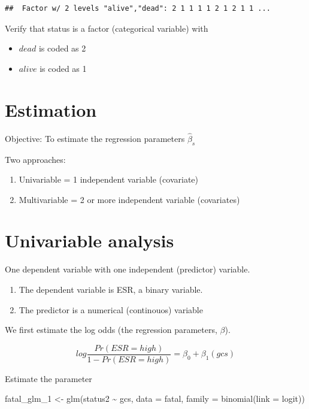 \documentclass[
]{book}
\makeatletter
\newenvironment{Shaded}{\begin{snugshade}}{\end{snugshade}}
\newcommand{\AttributeTok}[1]{\textcolor[rgb]{0.61,0.61,0.61}{#1}}
\newcommand{\FunctionTok}[1]{\textcolor[rgb]{0,0,0}{#1}}
\newcommand{\NormalTok}[1]{#1}
\newcommand{\OtherTok}[1]{\textcolor[rgb]{0.37,0.37,0.37}{#1}}
\newcommand{\SpecialCharTok}[1]{\textcolor[rgb]{0,0,0}{#1}}
\newcommand{\StringTok}[1]{\textcolor[rgb]{0.5,0.5,0.5}{#1}}
\providecommand{\tightlist}{%
  \setlength{\itemsep}{0pt}\setlength{\parskip}{0pt}}
\newenvironment{kframe}{%
\medskip{}
\setlength{\fboxsep}{.8em}
 \def\at@end@of@kframe{}%
 \ifinner\ifhmode%
  \def\at@end@of@kframe{\end{minipage}}%
  \begin{minipage}{\columnwidth}%
 \fi\fi%
 \def\FrameCommand##1{\hskip\@totalleftmargin \hskip-\fboxsep
 \colorbox{shadecolor}{##1}\hskip-\fboxsep
     \hskip-\linewidth \hskip-\@totalleftmargin \hskip\columnwidth}%
 \MakeFramed {\advance\hsize-\width
   \@totalleftmargin\z@ \linewidth\hsize
   \@setminipage}}%
 {\par\unskip\endMakeFramed%
 \at@end@of@kframe}
\renewenvironment{Shaded}{\begin{kframe}}{\end{kframe}}
\makeatother
\begin{document}
\begin{verbatim}
##  Factor w/ 2 levels "alive","dead": 2 1 1 1 1 2 1 2 1 1 ...
\end{verbatim}

Verify that status is a factor (categorical variable) with

\begin{itemize}
\tightlist
\item
  \(dead\) is coded as 2
\item
  \(alive\) is coded as 1
\end{itemize}

\hypertarget{estimation}{%
\section{Estimation}\label{estimation}}

Objective: To estimate the regression parameters \(\hat\beta_s\)

Two approaches:

\begin{enumerate}
\def\labelenumi{\arabic{enumi}.}
\tightlist
\item
  Univariable = 1 independent variable (covariate)
\item
  Multivariable = 2 or more independent variable (covariates)
\end{enumerate}

\hypertarget{univariable-analysis}{%
\section{Univariable analysis}\label{univariable-analysis}}

One dependent variable with one independent (predictor) variable.

\begin{enumerate}
\def\labelenumi{\arabic{enumi}.}
\tightlist
\item
  The dependent variable is ESR, a binary variable.
\item
  The predictor is a numerical (continouos) variable
\end{enumerate}

We first estimate the log odds (the regression parameters, \(\beta\)).

\[log\frac{Pr(ESR = high)}{1 - Pr(ESR = high)}  = \beta_0 + \beta_1(gcs)\]

Estimate the parameter

\begin{Shaded}
\begin{Highlighting}[]
\NormalTok{fatal\_glm\_1 }\OtherTok{\textless{}{-}} \FunctionTok{glm}\NormalTok{(status2 }\SpecialCharTok{\textasciitilde{}}\NormalTok{ gcs, }\AttributeTok{data =}\NormalTok{ fatal, }
                    \AttributeTok{family =} \FunctionTok{binomial}\NormalTok{(}\AttributeTok{link =} \StringTok{\textquotesingle{}logit\textquotesingle{}}\NormalTok{))}
\end{Highlighting}
\end{Shaded}
\end{document}
